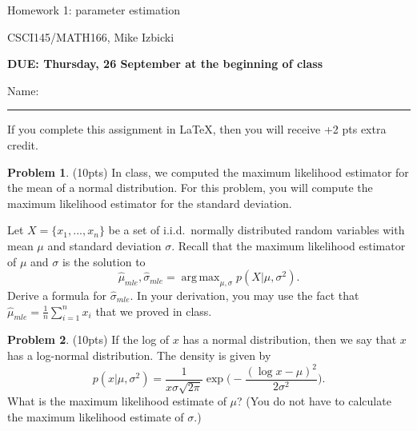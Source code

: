\documentclass[10pt]{article}
\theoremstyle{definition}
\newtheorem{problem}{Problem}
\DeclareMathOperator*{\argmax}{arg\,max}
\newcommand{\mle}[1]{\hat{#1}_{\textit{mle}}}
\begin{document}
\begin{center}
    {
\Large
Homework 1: parameter estimation
}

    \vspace{0.1in}
CSCI145/MATH166, Mike Izbicki

    \vspace{0.1in}
    \textbf{DUE: Thursday, 26 September at the beginning of class}

    \vspace{0.1in}
\end{center}

\vspace{0.25in}
\noindent
Name: 

\noindent
\rule{\textwidth}{0.1pt}
\vspace{0.05in}

\noindent
If you complete this assignment in \LaTeX, then you will receive +2 pts extra credit.

\begin{problem}
    (10pts) 
    In class, we computed the maximum likelihood estimator for the mean of a normal distribution.
    For this problem, you will compute the maximum likelihood estimator for the standard deviation.

    Let $X=\{x_1,...,x_n\}$ be a set of i.i.d.\ normally distributed random variables with mean $\mu$ and standard deviation $\sigma$.
    Recall that the maximum likelihood estimator of $\mu$ and $\sigma$ is the solution to
    \begin{equation}
        \mle\mu, \mle\sigma = \argmax_{\mu,\sigma} p(X | \mu, \sigma^2).
    \end{equation}
    Derive a formula for $\mle\sigma$.
    In your derivation, you may use the fact that $\mle\mu = \tfrac1n\sum_{i=1}^n x_i$ that we proved in class.
\end{problem}

\newpage
\begin{problem}
    \label{prob:poisson}
    (10pts) 
    If the log of $x$ has a normal distribution,
    then we say that $x$ has a log-normal distribution.
    The density is given by
    \begin{equation}
        p(x|\mu,\sigma^2) = \frac{1}{x\sigma\sqrt{2\pi}}\exp\bigg(-\frac{(\log x - \mu)^2}{2\sigma^2}\bigg).
    \end{equation}
    What is the maximum likelihood estimate of $\mu$?
    (You do not have to calculate the maximum likelihood estimate of $\sigma$.)
\end{problem}
\end{document}
